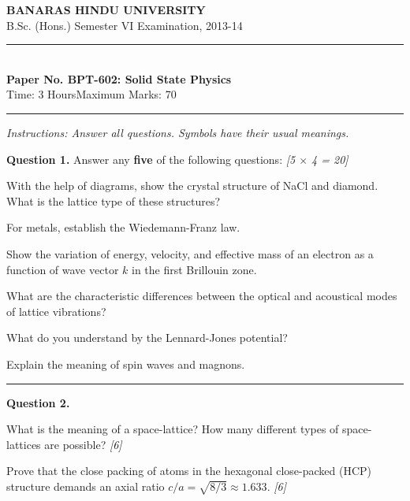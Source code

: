 \documentclass[11pt,a4paper]{article}
\newcommand{\pts}[1]{\hfill   \textit{[#1]}}
\begin{document}
\begin{center}
  {\large\bfseries BANARAS HINDU UNIVERSITY}\\[2pt]
  {\normalsize B.Sc. (Hons.) Semester VI Examination, 2013-14}\\[6pt]
  \rule{0.8\linewidth}{0.5pt}\\[6pt]
  {\large\bfseries Paper No. BPT-602: Solid State Physics}\\[4pt]
  {\normalsize Time: 3 Hours\hfill Maximum Marks: 70}
\end{center}
\rule{\linewidth}{0.4pt}
\smallskip



\noindent   \textit{Instructions: Answer all questions. Symbols have their usual meanings.}
\bigskip




\noindent   \textbf{Question 1.} Answer any   \textbf{five} of the following questions: \pts{5 $ \times$ 4 = 20}

\begin{parts}
  \item With the help of diagrams, show the crystal structure of NaCl and diamond. What is the lattice type of these structures?
  \item For metals, establish the Wiedemann-Franz law.
  \item Show the variation of energy, velocity, and effective mass of an electron as a function of wave vector $k$ in the first Brillouin zone.
  \item What are the characteristic differences between the optical and acoustical modes of lattice vibrations?
  \item What do you understand by the Lennard-Jones potential?
  \item Explain the meaning of spin waves and magnons.
\end{parts}

\medskip\rule{\linewidth}{0.2pt}




\noindent   \textbf{Question 2.}

\begin{parts}
  \item What is the meaning of a space-lattice? How many different types of space-lattices are possible? \pts{6}
  \item Prove that the close packing of atoms in the hexagonal close-packed (HCP) structure demands an axial ratio $c/a = \sqrt{8/3} \approx 1.633$. \pts{6}
\end{parts}
\end{document}
